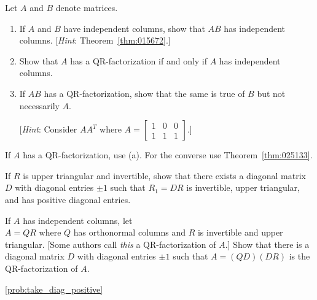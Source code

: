 \documentclass{ximera}
\begin{document}
\begin{problem}\label{prob:indcolumns}
Let $A$ and $B$ denote matrices.


\begin{enumerate} 
\item If $A$ and $B$ have independent columns, show that $AB$ has independent columns. [\textit{Hint}: Theorem~\ref{thm:015672}.]

\item Show that $A$ has a QR-factorization if and only if $A$ has independent columns.

\item If $AB$ has a QR-factorization, show that the same is true of $B$ but not necessarily $A$.


[\textit{Hint}: Consider $AA^{T}$ where $A = \left[ \begin{array}{rrr}
1 & 0 & 0 \\
1 & 1 & 1
\end{array}\right]$.]

\end{enumerate}
\begin{hint}
If $A$ has a QR-factorization, use (a). For the converse use Theorem~\ref{thm:025133}.
\end{hint}
\end{problem}

\begin{problem}\label{prob:take_diag_positive}
If $R$ is upper triangular and invertible, show that there exists a diagonal matrix $D$ with diagonal entries $\pm 1$ such that $R_{1} = DR$ is invertible, upper triangular, and has positive diagonal entries.
\end{problem}

\begin{problem}\label{prob:fullQR}
If $A$ has independent columns, let \\ $A = QR$ where $Q$ has orthonormal columns and $R$ is invertible and upper triangular. [Some authors call \textit{this} a QR-factorization of $A$.] Show that there is a diagonal matrix $D$ with diagonal entries $\pm 1$ such that $A = (QD)(DR)$ is the QR-factorization of $A$.
\begin{hint}
\ref{prob:take_diag_positive}
\end{hint}
\end{problem}
\end{document}
